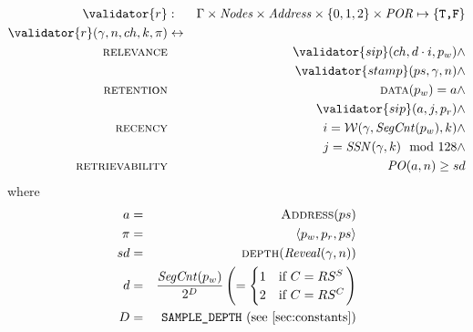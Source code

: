 \begin{definition}
\label{def:por-validation}
%
\begin{eqnarray}
\validator{r}&:&\Gamma\times\mathit{Nodes}\times\mathit{Address}\times\{0,1,2\}\times\mathit{POR}\mapsto\{\texttt{T,F}\}\\
\validator{r}(\gamma, n, ch, k, \pi)&\leftrightarrow& \\
\textsc{relevance}&&\validator{sip}(ch,d\cdot i,p_w)\land\\
    && \validator{stamp}(ps, \gamma, n) \land\\
\textsc{retention}&& \textsc{data}(p_w)=a\land\\
    && \validator{sip}(a,j,p_r)\land\\
\textsc{recency}&&i=\mathcal{W}(\gamma,\mathit{SegCnt}(p_w),k)\land\\
    &&j = \mathit{SSN}(\gamma,k)\mod 128\land\\
\textsc{retrievability}&&\mathit{PO}(a,n) \geq sd 
\end{eqnarray}
where
\begin{eqnarray}
a&=& \textsc{Address}(ps)\\
\pi&=&\langle p_w, p_r, ps\rangle\\
sd &=& \textsc{depth}(\mathit{Reveal}(\gamma, n))\\
d&=&\frac{\mathit{SegCnt}(p_w)}{2^D}\left(=\begin{cases}
    1& \text{if } C=RS^S\\
2 &\text{if } C=RS^C
\end{cases}\right)\\
D& =& \texttt{SAMPLE\_DEPTH} \text{ (see \ref{sec:constants})}
\end{eqnarray}
\end{definition}


